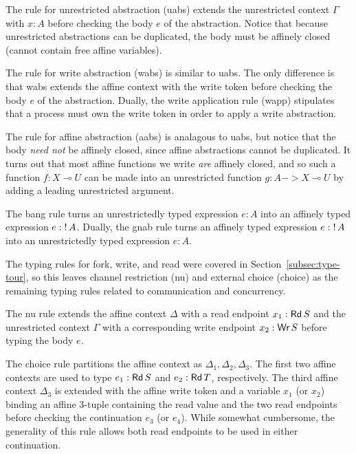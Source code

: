 The rule for unrestricted abstraction (uabs) extends the unrestricted
context $\Gamma$ with $x : A$ before checking the body $e$ of the abstraction. Notice
that because unrestricted abstractions can be duplicated, the body must be
affinely closed (cannot contain free affine variables).

The rule for write abstraction (wabs) is similar to uabs. The only difference is
that wabs extends the affine context with the write token before checking the
body $e$ of the abstraction. Dually, the write application rule (wapp)
stipulates that a process must own the write token in order to apply a write
abstraction.

The rule for affine abstraction (aabs) is analagous to uabs, but notice that the
body \emph{need not} be affinely closed, since affine abstractions cannot be
duplicated. It turns out that most affine functions we write \emph{are} affinely
closed, and so such a function $f : X \multimap U$ can be made into an unrestricted
function $g : A -> X \multimap U$ by adding a leading unrestricted argument.

The bang rule turns an unrestrictedly typed expression $e:A$ into an affinely
typed expression $e:{!}\,{A}$. Dually, the gnab rule turns an affinely typed
expression $e:{!}\,{A}$ into an unrestrictedly typed expression $e:A$.

The typing rules for fork, write, and read were covered in
Section~\ref{subsec:type-tour}, so this leaves channel restriction (nu) and
external choice (choice) as the remaining typing rules related to communication
and concurrency.

The nu rule extends the affine context $\Delta$ with a read endpoint $x_1 : \textnormal{\textsf{Rd}}\,S$
and the unrestricted context $\Gamma$ with a corresponding write endpoint $x_2
: \textnormal{\textsf{Wr}}\,S$ before typing the body $e$.

The choice rule partitions the affine context as $\Delta_1,\Delta_2,\Delta_3$. The first two
affine contexts are used to type $e_1 : \textnormal{\textsf{Rd}}\,S$ and $e_2 : \textnormal{\textsf{Rd}}\,T$,
respectively. The third affine context $\Delta_3$ is extended with the affine write
token and a variable $x_1$ (or $x_2$) binding an affine 3-tuple containing the
read value and the two read endpoints before checking the continuation $e_3$ (or
$e_4$). While somewhat cumbersome, the generality of this rule allows both read
endpoints to be used in either continuation.


